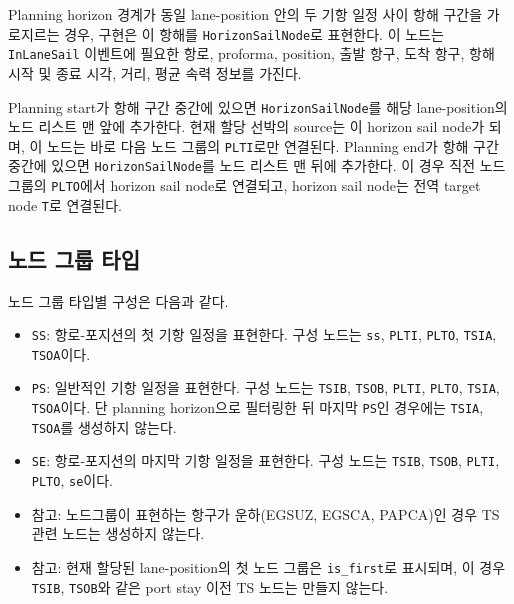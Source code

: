 \documentclass[11pt]{article}
\begin{document}
Planning horizon 경계가 동일 lane-position 안의 두 기항 일정 사이 항해 구간을
가로지르는 경우, 구현은 이 항해를 \texttt{HorizonSailNode}로 표현한다.
이 노드는 \texttt{InLaneSail} 이벤트에 필요한 항로, proforma, position, 출발 항구,
도착 항구, 항해 시작 및 종료 시각, 거리, 평균 속력 정보를 가진다.

Planning start가 항해 구간 중간에 있으면 \texttt{HorizonSailNode}를 해당
lane-position의 노드 리스트 맨 앞에 추가한다. 현재 할당 선박의 source는 이
horizon sail node가 되며, 이 노드는 바로 다음 노드 그룹의 \texttt{PLTI}로만
연결된다. Planning end가 항해 구간 중간에 있으면 \texttt{HorizonSailNode}를
노드 리스트 맨 뒤에 추가한다. 이 경우 직전 노드 그룹의 \texttt{PLTO}에서
horizon sail node로 연결되고, horizon sail node는 전역 target node \texttt{T}로
연결된다.

\subsection{노드 그룹 타입}

노드 그룹 타입별 구성은 다음과 같다.

\begin{itemize}[leftmargin=*]
  \item \texttt{SS}: 항로-포지션의 첫 기항 일정을 표현한다. 구성 노드는
  \texttt{ss}, \texttt{PLTI}, \texttt{PLTO}, \texttt{TSIA},
  \texttt{TSOA}이다.
  \item \texttt{PS}: 일반적인 기항 일정을 표현한다. 구성 노드는
  \texttt{TSIB}, \texttt{TSOB}, \texttt{PLTI}, \texttt{PLTO},
  \texttt{TSIA}, \texttt{TSOA}이다. 단 planning horizon으로 필터링한 뒤 마지막
  \texttt{PS}인 경우에는 \texttt{TSIA}, \texttt{TSOA}를 생성하지 않는다.
  \item \texttt{SE}: 항로-포지션의 마지막 기항 일정을 표현한다. 구성 노드는
  \texttt{TSIB}, \texttt{TSOB}, \texttt{PLTI}, \texttt{PLTO},
  \texttt{se}이다.
  \item 참고: 노드그룹이 표현하는 항구가 운하(EGSUZ, EGSCA, PAPCA)인 경우 TS 관련 노드는 생성하지 않는다.
  \item 참고: 현재 할당된 lane-position의 첫 노드 그룹은 \texttt{is\_first}로 표시되며,
  이 경우 \texttt{TSIB}, \texttt{TSOB}와 같은 port stay 이전 TS 노드는 만들지 않는다.
\end{itemize}
\end{document}
